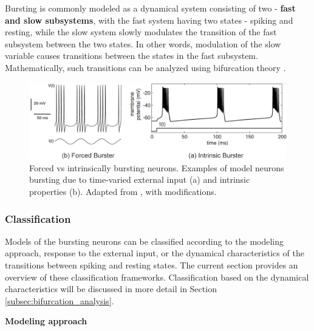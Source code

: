 \documentclass[../main.tex]{subfiles}
\begin{document}
Bursting is commonly modeled as a dynamical system consisting of two - \textbf{fast and slow subsystems}, with the fast system having two states - spiking and resting, while the slow system slowly modulates the transition of the fast subsystem between the two states. 
In other words, modulation of the slow variable causes transitions between the states in the fast subsystem. Mathematically, such transitions can be analyzed using bifurcation theory \cite{izhikevichDynamicalSystemsNeuroscience2006,izhikevichNEURALEXCITABILITYSPIKING2000,golombContributionPersistentNa2006}.

\begin{figure}[!t]
    \centering
    \includegraphics[width=0.85\linewidth]{../img/modeling_r5/examples/intrinsic_vs_forced_burster.png}
    \caption[Forced vs intrinsically bursting neurons]{
        Forced vs intrinsically bursting neurons. Examples of model neurons bursting due to time-varied external input (a) and intrinsic
        properties (b). Adapted from \parencite{izhikevichDynamicalSystemsNeuroscience2006}, with modifications.
    }
    \label{fig:example_forced_intrinsic_bursters}
\end{figure}

\subsubsection{Classification} \label{subsubsec:math_bursting_classification}

Models of the bursting neurons can be classified according to the modeling approach, response to the external input, or the dynamical characteristics of the transitions between spiking and resting states. The current section provides an overview of these classification frameworks. Classification based on the dynamical characteristics will be discussed in more detail in Section \ref{subsec:bifurcation_analysis}.

\vspace*{0.3cm}
\noindent\textbf{Modeling approach}
\end{document}

